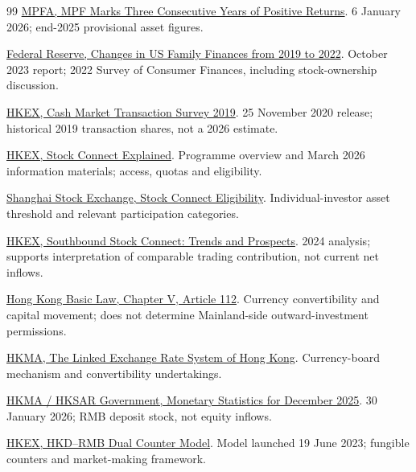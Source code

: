 \documentclass[11pt,a4paper]{article}
\begin{document}
\begin{thebibliography}{99}
 \href{https://www.mpfa.org.hk/en/info-centre/press-releases/20260106}{MPFA, MPF Marks Three Consecutive Years of Positive Returns}. 6 January 2026; end-2025 provisional asset figures.

 \href{https://www.federalreserve.gov/publications/october-2023-changes-in-us-family-finances-from-2019-to-2022.htm}{Federal Reserve, Changes in US Family Finances from 2019 to 2022}. October 2023 report; 2022 Survey of Consumer Finances, including stock-ownership discussion.

 \href{https://www.hkex.com.hk/News/News-Release/2020/2011253news?sc_lang=en}{HKEX, Cash Market Transaction Survey 2019}. 25 November 2020 release; historical 2019 transaction shares, not a 2026 estimate.

 \href{https://www.hkex.com.hk/Mutual-Market/Connect-Hub/Stock-Connect?sc_lang=en}{HKEX, Stock Connect Explained}. Programme overview and March 2026 information materials; access, quotas and eligibility.

 \href{https://english.sse.com.cn/access/stockconnect/eligibility/}{Shanghai Stock Exchange, Stock Connect Eligibility}. Individual-investor asset threshold and relevant participation categories.

 \href{https://www.hkexgroup.com/Media-Centre/Insight/Insight/2024/HKEX-Insight/Southbound-Stock-Connect-Trends-and-Prospects?sc_lang=en}{HKEX, Southbound Stock Connect: Trends and Prospects}. 2024 analysis; supports interpretation of comparable trading contribution, not current net inflows.

 \href{https://www.basiclaw.gov.hk/en/basiclaw/chapter5.html}{Hong Kong Basic Law, Chapter V, Article 112}. Currency convertibility and capital movement; does not determine Mainland-side outward-investment permissions.

 \href{https://www.hkma.gov.hk/media/eng/publication-and-research/reference-materials/monetary/HKMA_LERS_English_version.pdf}{HKMA, The Linked Exchange Rate System of Hong Kong}. Currency-board mechanism and convertibility undertakings.

 \href{https://www.info.gov.hk/gia/general/202601/30/P2026013000484p.htm}{HKMA / HKSAR Government, Monetary Statistics for December 2025}. 30 January 2026; RMB deposit stock, not equity inflows.

 \href{https://www.hkex.com.hk/services/trading/securities/overview/trading-mechanism/hkd-rmb-dual-counter-model?sc_lang=en}{HKEX, HKD--RMB Dual Counter Model}. Model launched 19 June 2023; fungible counters and market-making framework.


\end{thebibliography}
\end{document}
